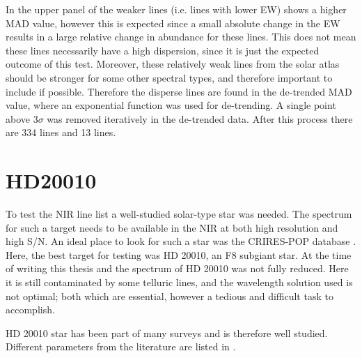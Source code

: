 In the upper panel of  the weaker lines (i.e. lines with lower EW) shows
a higher MAD value, however this is expected since a small absolute change in the EW results in a
large relative change in abundance for these lines. This does not mean these lines necessarily have
a high dispersion, since it is just the expected outcome of this test. Moreover, these relatively
weak lines from the solar atlas should be stronger for some other spectral types, and therefore
important to include if possible. Therefore the disperse lines are found in the de-trended MAD
value, where an exponential function was used for de-trending. A single point above $3\sigma$ was
removed iteratively in the de-trended data. After this process there are 334  lines and
13  lines.



\section{HD20010}
\label{sec:HD20010_first}

To test the NIR line list a well-studied solar-type star was needed. The spectrum for such a target
needs to be available in the NIR at both high resolution and high S/N. An ideal place to look for
such a star was the CRIRES-POP database \citep{Lebzelter2012}. Here, the best target for testing was
HD 20010, an F8 subgiant star. At the time of writing this thesis and \citet{Andreasen2016} the
spectrum of HD 20010 was not fully reduced. Here it is still contaminated by some telluric lines,
and the wavelength solution used is not optimal; both which are essential, however a tedious and
difficult task to accomplish.

HD 20010 star has been part of many surveys and is therefore well studied. Different parameters from
the literature are listed in .

